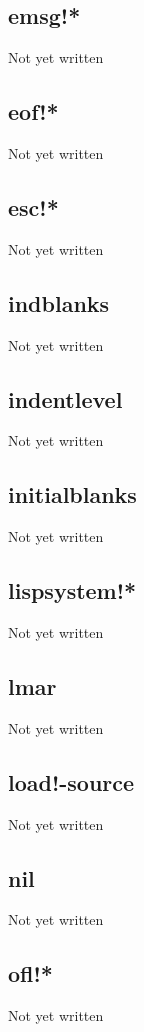 \documentclass[a4paper,11pt]{article}
\begin{document}
\subsection{\ttfamily emsg!*}
Not yet written

\subsection{\ttfamily eof!*}
Not yet written

\subsection{\ttfamily esc!*}
Not yet written

\subsection{\ttfamily indblanks}
Not yet written

\subsection{\ttfamily indentlevel}
Not yet written

\subsection{\ttfamily initialblanks}
Not yet written

\subsection{\ttfamily lispsystem!*}
Not yet written

\subsection{\ttfamily lmar}
Not yet written

\subsection{\ttfamily load!-source}
Not yet written

\subsection{\ttfamily nil}
Not yet written

\subsection{\ttfamily ofl!*}
Not yet written
\end{document}

